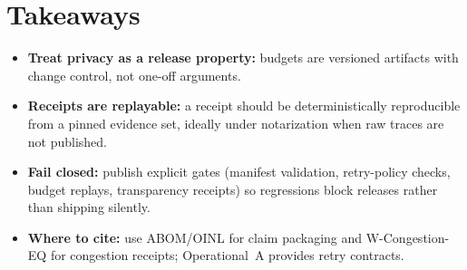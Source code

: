 \documentclass[11pt]{article}
\begin{document}
\section{Takeaways}
\begin{itemize}[leftmargin=*]
\item \textbf{Treat privacy as a release property:} budgets are versioned artifacts with change control, not one-off arguments.
\item \textbf{Receipts are replayable:} a receipt should be deterministically reproducible from a pinned evidence set, ideally under notarization when raw traces are not published.
\item \textbf{Fail closed:} publish explicit gates (manifest validation, retry-policy checks, budget replays, transparency receipts) so regressions block releases rather than shipping silently.
\item \textbf{Where to cite:} use ABOM/OINL for claim packaging and W-Congestion-EQ for congestion receipts; Operational~A provides retry contracts.
\end{itemize}
\end{document}

